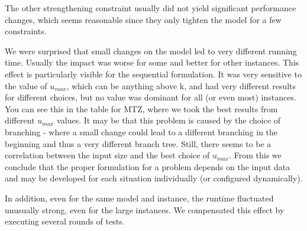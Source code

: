 \documentclass[,%
			paper=a4,%
			DIV14,
			liststotoc,
			bibtotoc,
			draft=false,%
			numbers=noendperiod
			]{scrartcl}
\begin{document}
The other strengthening constraint usually did not yield significant performance changes, which seems reasonable since they only tighten the model for a few constraints. 


We were surprised that small changes on the model led to very different running time. Usually the impact was worse for some and better for other instances. This effect is particularly visible for the sequential formulation. It was very sensitive to the value of $u_{max}$, which can be anything above k, and had very different results for different choices, but no value was dominant for all (or even most) instances. You can see this in the table for MTZ, where we took the best results from different $u_{max}$ values. It may be that this problem is caused by the choice of branching - where a small change could lead to a different branching in the beginning and thus a very different branch tree. Still, there seems to be a correlation between the input size and the best choice of $u_{max}$. From this we conclude that the proper formulation for a problem depends on the input data and may be developed for each situation individually (or configured dynamically).


In addition, even for the same model and instance, the runtime fluctuated unusually strong, even for the large instances. We compensated this effect by executing several rounds of tests.
\end{document}
